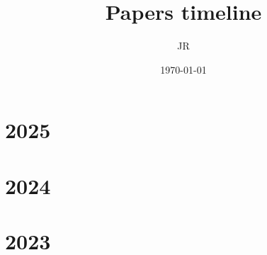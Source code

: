 \documentclass[10pt]{article}
\begin{document}
\title{\Large Papers timeline}
\author{JR}
\date{\today}

\maketitle

\tableofcontents

\newpage
\section{2025}
\begin{refsection}
    \nocite{deepseek-ai_deepseek-r1_2025}
    \printbibliography[heading=none]
\end{refsection}

\newpage
\section{2024}
\begin{refsection}
    \nocite{qwen_qwen25_2025}
    \nocite{muennighoff_olmoe_2025}
    \nocite{penedo_fineweb_2024}
    \nocite{grattafiori2024llama3herdmodels}
    \nocite{gu_mamba_2024}
    \nocite{groeneveld_olmo_2024}
    \nocite{deepseek-ai_deepseek-v2_2024}
    \printbibliography[heading=none]
\end{refsection}

\newpage
\section{2023}
\begin{refsection}
    \nocite{gu_mamba_2024}
    \nocite{jiang_mistral_2023}
    \nocite{touvron_llama_2023}
    \nocite{sun_principle-driven_2023}
    \nocite{anil_palm_2023}
    \nocite{peng_rwkv_2023}
    \nocite{rafailov_direct_2024}
    \nocite{yao_tree_2023}
    \nocite{noauthor_230401373_nodate}
    \nocite{liu_visual_2023}
    \nocite{longpre_flan_2023}
    \nocite{touvron2023llamaopenefficientfoundation}
    \nocite{huang_language_2023}
    \nocite{orvieto2023resurrectingrecurrentneuralnetworks}
    \nocite{noauthor_palm-e_nodate}
    \nocite{noauthor_gpt-4_2024}
    \nocite{longpre_flan_2023}
    \nocite{touvron2023llamaopenefficientfoundation}
    \printbibliography[heading=none]
\end{refsection}
\end{document}
